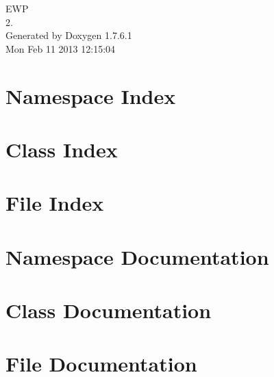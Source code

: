 \documentclass[a4paper]{book}
\begin{document}
\hypersetup{pageanchor=false,citecolor=blue}
\begin{titlepage}
\vspace*{7cm}
\begin{center}
{\Large \-E\-W\-P \\[1ex]\large 2. }\\
\vspace*{1cm}
{\large \-Generated by Doxygen 1.7.6.1}\\
\vspace*{0.5cm}
{\small Mon Feb 11 2013 12:15:04}\\
\end{center}
\end{titlepage}
\clearemptydoublepage
{}
\tableofcontents
\clearemptydoublepage
{}
\hypersetup{pageanchor=true,citecolor=blue}
\chapter{\-Namespace \-Index}

\chapter{\-Class \-Index}

\chapter{\-File \-Index}

\chapter{\-Namespace \-Documentation}

\chapter{\-Class \-Documentation}











\chapter{\-File \-Documentation}























\printindex
\end{document}
